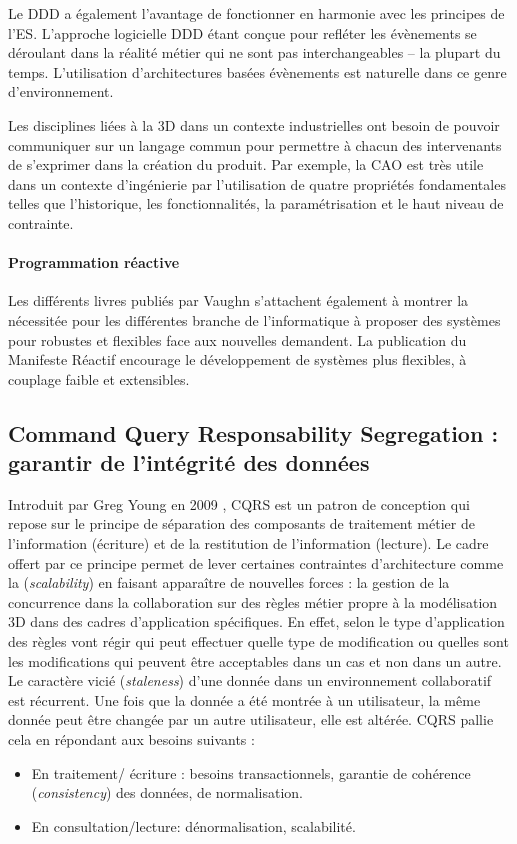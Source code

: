 	Le \gls{DDD} a également l'avantage de fonctionner en harmonie avec les 
	principes de l'\gls{ES}. L'approche logicielle \gls{DDD} étant conçue pour refléter 
	les évènements se déroulant dans la réalité métier qui ne sont pas 
	interchangeables -- la plupart du temps. L'utilisation d'architectures 
	basées évènements est naturelle dans ce genre d'environnement. 
	
	Les disciplines liées à la 3D dans un contexte industrielles ont besoin de 
	pouvoir 
	communiquer sur un langage commun pour permettre à chacun des 
	intervenants 
	de s'exprimer dans la création du produit. Par exemple, la \gls{CAO} est très 
	utile 
	dans un contexte d'ingénierie par l'utilisation de quatre propriétés fondamentales 
	telles que l'historique, les fonctionnalités, la paramétrisation et le haut niveau de 
	contrainte.
	
	\paragraph{Programmation réactive}
	Les différents livres publiés par Vaughn s'attachent également à montrer la 
	nécessitée pour les différentes branche de l'informatique à proposer des 
	systèmes 
	pour robustes et flexibles face aux nouvelles demandent. La publication du 
	Manifeste Réactif encourage le développement de systèmes \og plus flexibles, 
	à 
	couplage faible et extensibles\fg{}.
	
	
	\subsection{Command Query Responsability Segregation : garantir de 
	l'intégrité 
	des données }
\label{sec:CQRS}
Introduit par Greg Young en 2009 \cite{Young2009}, \gls{CQRS} est un patron de 
conception qui repose sur le principe de séparation des composants de traitement 
métier de l'information (écriture) et de la restitution de l'information (lecture). Le 
cadre offert par ce principe permet de lever certaines contraintes d'architecture 
comme la (\textit{scalability}) en faisant apparaître de nouvelles forces : la gestion 
de la concurrence dans la collaboration sur des règles métier propre à la 
modélisation 3D dans des cadres d'application spécifiques. En effet, selon le type 
d'application des règles vont régir qui peut effectuer quelle type de modification ou 
quelles sont les modifications qui peuvent être acceptables dans un cas et non 
dans un autre.
Le caractère vicié (\textit{staleness}) d'une donnée dans un environnement 
collaboratif est récurrent. Une fois que la donnée a été montrée à un utilisateur, la 
même donnée peut être changée par un autre utilisateur, elle est altérée. 
\gls{CQRS} pallie cela en répondant aux besoins suivants :
\begin{itemize}
	\item En traitement/ écriture : besoins transactionnels, garantie de cohérence 
	(\textit{consistency}) des données, de normalisation.
	\item En consultation/lecture: dénormalisation, scalabilité. 
\end{itemize}

